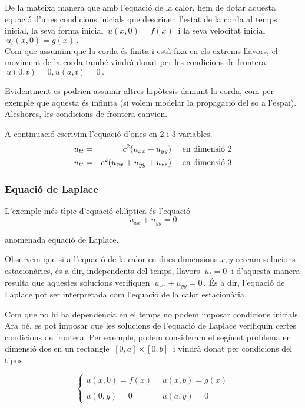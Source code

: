 \documentclass[12pt]{article}
\begin{document}
De la mateixa manera que amb l'equaci{\'o} de la calor, hem de dotar aquesta equaci{\'o} d'unes condicions inicials que descriuen l'estat de la corda al temps inicial, la seva forma inicial $\ u(x,0)=f(x)\ $ i la seva velocitat inicial $\ u_t(x,0)=g(x)\,.$\\

Com que assumim que la corda {\'e}s finita i est{\`a} fixa en els extrems llavors, el moviment de la corda tamb{\'e}
vindr{\`a} donat per les condicions de frontera: $\ u(0,t)=0, u(a,t)=0\,.$

Evidentment es podrien assumir altres hip{\`o}tesis damunt la corda, com per exemple que aquesta {\'e}s infinita (si volem modelar la propagaci{\'o} del so a l'espai). Aleshores, les condicions de frontera canvien.


A continuaci{\'o} escrivim l'equaci{\'o} d'ones en  2 i 3 variables.
\vspace{0.4cm}\begin{eqnarray*}
u_{tt}&=&c^2(u_{xx}+u_{yy})\quad\hbox{ en dimensi{\'o} 2}\\
u_{tt}&=&c^2(u_{xx}+u_{yy}+u_{zz})\quad \hbox{ en dimensi{\'o} 3}
\end{eqnarray*}


\subsubsection{Equaci{\'o} de Laplace}

L'exemple m{\'e}s t{\'\i}pic  d'equaci{\'o} el.l{\'\i}ptica {\'e}s l'equaci{\'o}
$$
u_{xx}+u_{yy}=0
$$

anomenada equaci{\'o} de Laplace.


Observem que si a l'equaci{\'o} de la calor  en dues dimensions $x,y$ cercam solucions
estacion{\`a}ries, {\'e}s a dir, independents del temps, llavors $\ u_t = 0\ $ i d'aquesta manera resulta que aquestes solucions verifiquen $\ u_{xx}+u_{yy}= 0\,.$ {\'E}s a dir, l'equaci{\'o} de Laplace pot
ser interpretada com l'equaci{\'o} de la calor estacion{\`a}ria.

Com que no hi ha depend{\`e}ncia en el temps no podem imposar condicions inicials. Ara b{\'e}, es pot imposar que les solucions de l'equaci{\'o} de Laplace verifiquin certes condicions de frontera. Per exemple, podem consideram el seg{\"u}ent problema en dimensi{\'o} dos en un rectangle $\ [0,a]\times [0,b]\ $ i vindr{\`a} donat per  condicions del tipus:

\[
\left\{\begin{array}{ll}
u(x,0)=f(x)\ \ & u(x,b)=g(x)\\
\\
u(0,y)=0 \ \ & u(a,y)=0
\end{array}
\right.
\]
\end{document}
